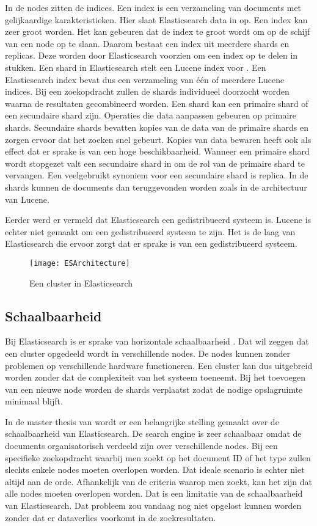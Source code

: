 In de nodes zitten de indices. Een index is een verzameling van documents met gelijkaardige karakteristieken. Hier slaat Elasticsearch data in op. Een index kan zeer groot worden. Het kan gebeuren dat de index te groot wordt om op de schijf van een node op te slaan. Daarom bestaat een index uit meerdere shards en replicas. Deze worden door Elasticsearch voorzien om een index op te delen in stukken. Een shard in Elasticsearch stelt een Lucene index voor \autocite{Brasetvik2017}. Een Elasticsearch index bevat dus een verzameling van één of meerdere Lucene indices. Bij een zoekopdracht zullen de shards individueel doorzocht worden waarna de resultaten gecombineerd worden. Een shard kan een primaire shard of een secundaire shard zijn. Operaties die data aanpassen gebeuren op primaire shards. Secundaire shards bevatten kopies van de data van de primaire shards en zorgen ervoor dat het zoeken snel gebeurt. Kopies van data bewaren heeft ook als effect dat er sprake is van een hoge beschikbaarheid. Wanneer een primaire shard wordt stopgezet valt een secundaire shard in om de rol van de primaire shard te vervangen. Een veelgebruikt synoniem voor een secundaire shard is replica. In de shards kunnen de documents dan teruggevonden worden zoals in de architectuur van Lucene.

Eerder werd er vermeld dat Elasticsearch een gedistribueerd systeem is. Lucene is echter niet gemaakt om een gedistribueerd systeem te zijn. Het is de laag van Elasticsearch die ervoor zorgt dat er sprake is van een gedistribueerd systeem.

\begin{figure}
	\centering
	\texttt{[image: ESArchitecture]}
	\caption{Een cluster in Elasticsearch}
	\label{fig:ESArchitecture}
\end{figure}

\subsection{Schaalbaarheid}

Bij Elasticsearch is er sprake van horizontale schaalbaarheid \autocite{Dixit2016}. Dat wil zeggen dat een cluster opgedeeld wordt in verschillende nodes. De nodes kunnen zonder problemen op verschillende hardware functioneren. Een cluster kan dus uitgebreid worden zonder dat de complexiteit van het systeem toeneemt. Bij het toevoegen van een nieuwe node worden de shards verplaatst zodat de nodige opslagruimte minimaal blijft.

In de master thesis van \textcite{Berglund2013} wordt er een belangrijke stelling gemaakt over de schaalbaarheid van Elasticsearch. De search engine is zeer schaalbaar omdat de documents organisatorisch verdeeld zijn over verschillende nodes. Bij een specifieke zoekopdracht waarbij men zoekt op het document ID of het type zullen slechts enkele nodes moeten overlopen worden. Dat ideale scenario is echter niet altijd aan de orde. Afhankelijk van de criteria waarop men zoekt, kan het zijn dat alle nodes moeten overlopen worden. Dat is een limitatie van de schaalbaarheid van Elasticsearch. Dat probleem zou vandaag nog niet opgelost kunnen worden zonder dat er dataverlies voorkomt in de zoekresultaten. 

